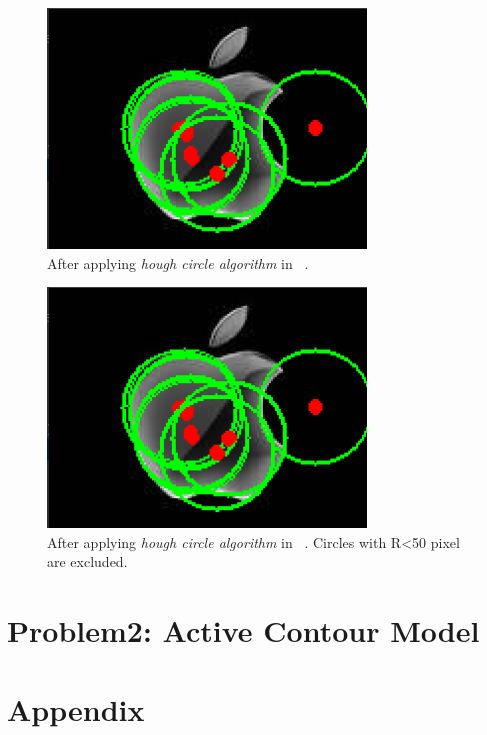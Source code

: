 \documentclass[letterpaper, 12 pt, conference ,onecolumn]{ieeeconf}  %
\begin{document}
\begin{figure}[h!]
\includegraphics[width=0.4\paperwidth]{hough-circles/apple-circles1.jpg}
\caption{After applying \textit{hough circle algorithm} in ~.}
\label{fig:apple1-circles1}
\end{figure}

\begin{figure}[h!]
\includegraphics[width=0.4\paperwidth]{hough-circles/apple-circles1.jpg}
\caption{After applying \textit{hough circle algorithm} in ~. Circles with R<50 pixel are excluded.}
\label{fig:apple1-circles2}
\end{figure}

\section*{Problem2: Active Contour Model}


\section*{Appendix }







\end{document}
